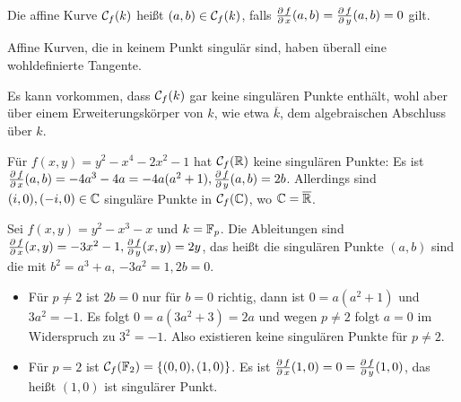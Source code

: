 \begin{defn}
	Die affine Kurve $\mathcal{C}_f(k)$ heißt  $(a,b) \in \mathcal{C}_f(k)$, falls $\frac{\operatorname{\partial} f}{\operatorname{\partial} x}(a,b) = \frac{\operatorname{\partial} f}{\operatorname{\partial} y}(a,b) = 0$ gilt. 
\end{defn}

\begin{bem}
	Affine Kurven, die in keinem Punkt singulär sind, haben überall eine wohldefinierte Tangente.
\end{bem}

\begin{bem}
	Es kann vorkommen, dass $\mathcal{C}_f(k)$ gar keine singulären Punkte enthält, wohl aber über einem Erweiterungskörper von $k$, wie etwa $\overline{k}$, dem algebraischen Abschluss über $k$.
\end{bem}

\begin{bsp}
	Für $f(x,y) = y^2 - x^4 - 2x^2 - 1$ hat $\mathcal{C}_f(\mathbb{R})$ keine singulären Punkte: Es ist $\frac{\operatorname{\partial} f}{\operatorname{\partial} x}(a,b) = -4a^3 - 4a = -4a(a^2+1), \frac{\operatorname{\partial} f}{\operatorname{\partial} y}(a,b) = 2b$. Allerdings sind $(i,0),(-i,0) \in \mathbb{C}$ singuläre Punkte in $\mathcal{C}_f(\mathbb{C})$, wo $\mathbb{C} = \overline{\mathbb{R}}$.
\end{bsp}

\begin{bsp}
	Sei $f(x,y) = y^2 - x^3 - x$ und $k = \mathbb{F}_p$. Die Ableitungen sind $\frac{\operatorname{\partial} f}{\operatorname{\partial} x} (x,y) = -3x^2-1, \frac{\operatorname{\partial} f}{\operatorname{\partial} y}(x,y) = 2y$, das heißt die singulären Punkte $(a,b)$ sind die mit $b^2 = a^3 + a$, $-3a^2 = 1, 2b=0$.\begin{itemize}
		\item Für $p \neq 2$ ist $2b = 0$ nur für $b = 0$ richtig, dann ist $0 = a(a^2+1)$ und $3a^2 = -1$. Es folgt $0 = a(3a^2 + 3) = 2a$ und wegen $p \neq 2$ folgt $a = 0$ im Widerspruch zu $3^2=-1$. Also existieren keine singulären Punkte für $p \neq 2$.
		\item Für $p = 2$ ist $\mathcal{C}_f(\mathbb{F}_2) = \{(0,0),(1,0)\}$. Es ist $\frac{\operatorname{\partial} f}{\operatorname{\partial} x} (1,0) = 0 = \frac{\operatorname{\partial} f}{\operatorname{\partial} y}(1,0)$, das heißt $(1,0)$ ist singulärer Punkt.
	\end{itemize}
\end{bsp}